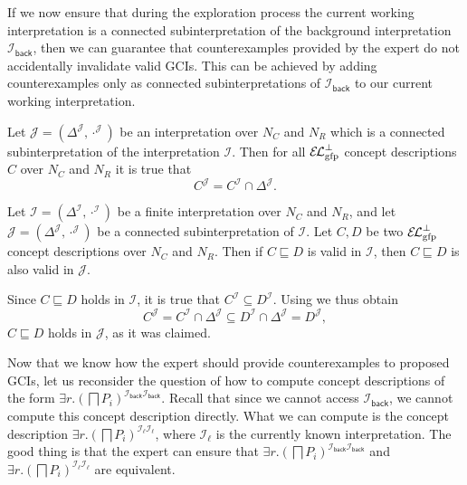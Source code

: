 If we now ensure that during the exploration process the current working interpretation is
a connected subinterpretation of the background interpretation
$\mathcal{I}_{\mathsf{back}}$, then we can guarantee that counterexamples provided by the
expert do not accidentally invalidate valid GCIs.  This can be achieved by adding
counterexamples only as connected subinterpretations of $\mathcal{I}_{\mathsf{back}}$ to
our current working interpretation.

\begin{Lemma}
  \label{lem:Felix-6.12}
  Let $\mathcal{J} = (\Delta^{\mathcal{J}}, \cdot^{\mathcal{J}})$ be an interpretation
  over $N_{C}$ and $N_{R}$ which is a connected subinterpretation of the interpretation
  $\mathcal{I}$.  Then for all $\ELgfpbot$ concept descriptions $C$ over $N_{C}$ and
  $N_{R}$ it is true that
  \begin{equation*}
    C^{\mathcal{J}} = C^{\mathcal{I}} \cap \Delta^{\mathcal{J}}.
  \end{equation*}
\end{Lemma}

\begin{Theorem}
  \label{thm:GCIs-valid-in-interpretations-are-also-valid-in-connected-subinterpretations}
  Let $\mathcal{I} = (\Delta^{\mathcal{I}}, \cdot^{\mathcal{I}})$ be a finite
  interpretation over $N_{C}$ and $N_{R}$, and let $\mathcal{J} = (\Delta^{\mathcal{J}},
  \cdot^{\mathcal{J}})$ be a connected subinterpretation of $\mathcal{I}$.  Let $C, D$ be
  two $\ELgfpbot$ concept descriptions over $N_{C}$ and $N_{R}$.  Then if $C \sqsubseteq
  D$ is valid in $\mathcal{I}$, then $C \sqsubseteq D$ is also valid in $\mathcal{J}$.
\end{Theorem}
\begin{Proof}
  Since $C \sqsubseteq D$ holds in $\mathcal{I}$, it is true that $C^{\mathcal{I}}
  \subseteq D^{\mathcal{I}}$.  Using  we thus obtain
  \begin{equation*}
    C^{\mathcal{J}} = C^{\mathcal{I}} \cap \Delta^{\mathcal{J}} \subseteq D^{\mathcal{I}}
    \cap \Delta^{\mathcal{J}} = D^{\mathcal{J}},
  \end{equation*}
  \ie $C \sqsubseteq D$ holds in $\mathcal{J}$, as it was claimed.
\end{Proof}

Now that we know how the expert should provide counterexamples to proposed GCIs, let us
reconsider the question of how to compute concept descriptions of the form $\exists
r. (\bigsqcap P_{i})^{\mathcal{I}_{\mathsf{back}}\mathcal{I}_{\mathsf{back}}}$.  Recall
that since we cannot access $\mathcal{I}_{\mathsf{back}}$, we cannot compute this concept
description directly.  What we can compute is the concept description $\exists
r. (\bigsqcap P_{i})^{\mathcal{I}_{\ell}\mathcal{I}_{\ell}}$, where $\mathcal{I}_{\ell}$
is the currently known interpretation.  The good thing is that the expert can ensure that
$\exists r. (\bigsqcap P_{i})^{\mathcal{I}_{\mathsf{back}}\mathcal{I}_{\mathsf{back}}}$
and $\exists r. (\bigsqcap P_{i})^{\mathcal{I}_{\ell}\mathcal{I}_{\ell}}$ are equivalent.

